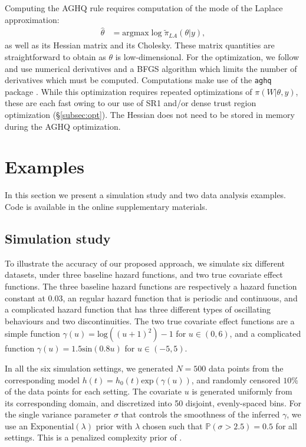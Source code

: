 \documentclass[ba]{imsart}
\begin{document}
Computing the AGHQ rule requires computation of the mode of the Laplace approximation:
\begin{equation}\begin{aligned}
\widehat{\theta} &= \text{argmax}\log\widetilde{\pi}_{LA}(\theta|y),
\end{aligned}\end{equation}
as well as its Hessian matrix and its Cholesky. These matrix quantities are straightforward to obtain as $\theta$ is low-dimensional. For the optimization, we follow \citet{inla} and use numerical derivatives and a BFGS algorithm which limits the number of derivatives which must be computed. Computations make use of the \texttt{aghq} package \citep{stringeraghqpackage}. While this optimization requires repeated optimizations of $\pi(W|\theta,y)$, these are each fast owing to our use of SR1 and/or dense trust region optimization (\S\ref{subsec:opt}). The Hessian does not need to be stored in memory during the AGHQ optimization.

\section{Examples}\label{sec:example}

In this section we present a simulation study and two data analysis examples. Code is available in the online supplementary materials.

\subsection{Simulation study}\label{subsec:sim}

To illustrate the accuracy of our proposed approach, we simulate six different datasets, under three baseline hazard functions, and two true covariate effect functions. The three baseline hazard functions are respectively a hazard function constant at 0.03, an regular hazard function that is periodic and continuous, and a complicated hazard function that has three different types of oscillating behaviours and two discontinuities. The two true covariate effect functions are a simple function $\gamma(u) = \text{log}((u + 1)^2) - 1$ for $u \in (0,6)$, and a complicated function $\gamma(u) = 1.5 \text{sin}(0.8 u)$ for $ u \in (-5,5)$.

In all the six simulation settings, we  generated $N = 500$ data points from the corresponding model $h(t) = h_{0}(t) \text{exp}(\gamma(u))$, and randomly censored $10\%$ of the data points for each setting. The covariate $u$ is generated uniformly from its corresponding domain, and discretized into 50 disjoint, evenly-spaced bins. For the single variance parameter $\sigma$ that controls the smoothness of the inferred $\gamma$, we use an $\text{Exponential}(\lambda)$ prior with $\lambda$ chosen such that $\mathbb{P}\left( \sigma > 2.5\right) = 0.5$ for all settings. This is a penalized complexity prior of \cite{pcprior}. 
\end{document}
